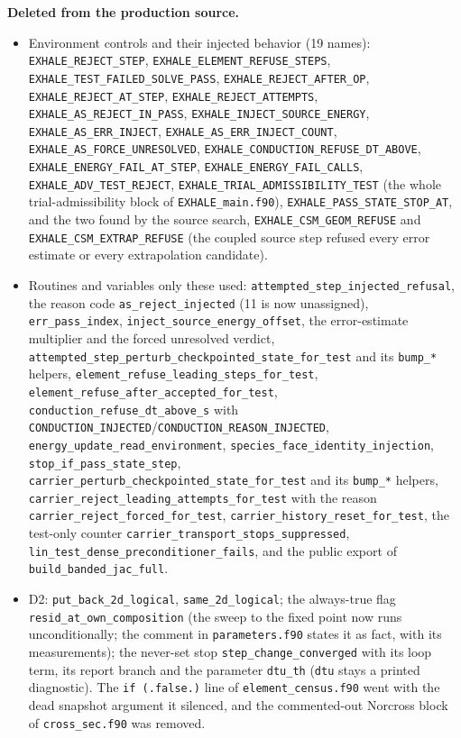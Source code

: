 \documentclass[english,a4paper]{my_memo}
\providecommand{\tightlist}{\setlength{\itemsep}{0pt}\setlength{\parskip}{0pt}}
\begin{document}
\textbf{Deleted from the production source.}

\begin{itemize}
\tightlist
\item
  Environment controls and their injected behavior (19 names): \texttt{EXHALE\_REJECT\_STEP}, \texttt{EXHALE\_ELEMENT\_REFUSE\_STEPS}, \texttt{EXHALE\_TEST\_FAILED\_SOLVE\_PASS}, \texttt{EXHALE\_REJECT\_AFTER\_OP}, \texttt{EXHALE\_REJECT\_AT\_STEP}, \texttt{EXHALE\_REJECT\_ATTEMPTS}, \texttt{EXHALE\_AS\_REJECT\_IN\_PASS}, \texttt{EXHALE\_INJECT\_SOURCE\_ENERGY}, \texttt{EXHALE\_AS\_ERR\_INJECT}, \texttt{EXHALE\_AS\_ERR\_INJECT\_COUNT}, \texttt{EXHALE\_AS\_FORCE\_UNRESOLVED}, \texttt{EXHALE\_CONDUCTION\_REFUSE\_DT\_ABOVE}, \texttt{EXHALE\_ENERGY\_FAIL\_AT\_STEP}, \texttt{EXHALE\_ENERGY\_FAIL\_CALLS}, \texttt{EXHALE\_ADV\_TEST\_REJECT}, \texttt{EXHALE\_TRIAL\_ADMISSIBILITY\_TEST} (the whole trial-admissibility block of \texttt{EXHALE\_main.f90}), \texttt{EXHALE\_PASS\_STATE\_STOP\_AT}, and the two found by the source search, \texttt{EXHALE\_CSM\_GEOM\_REFUSE} and \texttt{EXHALE\_CSM\_EXTRAP\_REFUSE} (the coupled source step refused every error estimate or every extrapolation candidate).
\item
  Routines and variables only these used: \texttt{attempted\_step\_injected\_refusal}, the reason code \texttt{as\_reject\_injected} (11 is now unassigned), \texttt{err\_pass\_index}, \texttt{inject\_source\_energy\_offset}, the error-estimate multiplier and the forced unresolved verdict, \texttt{attempted\_step\_perturb\_checkpointed\_state\_for\_test} and its \texttt{bump\_*} helpers, \texttt{element\_refuse\_leading\_steps\_for\_test}, \texttt{element\_refuse\_after\_accepted\_for\_test}, \texttt{conduction\_refuse\_dt\_above\_s} with \texttt{CONDUCTION\_INJECTED}/\texttt{CONDUCTION\_REASON\_INJECTED}, \texttt{energy\_update\_read\_environment}, \texttt{species\_face\_identity\_injection}, \texttt{stop\_if\_pass\_state\_step}, \texttt{carrier\_perturb\_checkpointed\_state\_for\_test} and its \texttt{bump\_*} helpers, \texttt{carrier\_reject\_leading\_attempts\_for\_test} with the reason \texttt{carrier\_reject\_forced\_for\_test}, \texttt{carrier\_history\_reset\_for\_test}, the test-only counter \texttt{carrier\_transport\_stops\_suppressed}, \texttt{lin\_test\_dense\_preconditioner\_fails}, and the public export of \texttt{build\_banded\_jac\_full}.
\item
  D2: \texttt{put\_back\_2d\_logical}, \texttt{same\_2d\_logical}; the always-true flag \texttt{resid\_at\_own\_composition} (the sweep to the fixed point now runs unconditionally; the comment in \texttt{parameters.f90} states it as fact, with its measurements); the never-set stop \texttt{step\_change\_converged} with its loop term, its report branch and the parameter \texttt{dtu\_th} (\texttt{dtu} stays a printed diagnostic). The \texttt{if\ (.false.)} line of \texttt{element\_census.f90} went with the dead snapshot argument it silenced, and the commented-out Norcross block of \texttt{cross\_sec.f90} was removed.
\end{itemize}
\end{document}
